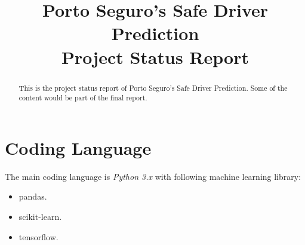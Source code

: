 \documentclass[conference, draftcls,12pt]{IEEEtran}
\begin{document}
\title{Porto Seguro's Safe Driver Prediction\\Project Status Report}
\author{
}

\maketitle

\begin{abstract}
This is the project status report of Porto Seguro's Safe Driver Prediction. Some of the content would be part of the final report.
\end{abstract}









\section{Coding Language}

The main coding language is \emph{Python 3.x} with following machine learning library:
\begin{itemize}
    \item pandas.
    \item scikit-learn.
    \item tensorflow.
\end{itemize}



\end{document}
